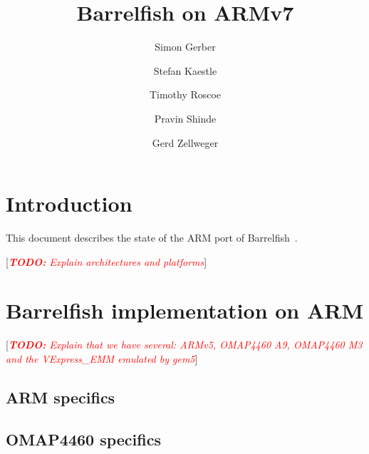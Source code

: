 \documentclass[a4paper,twoside]{report} %
\title{Barrelfish on ARMv7}   %
\author{Simon Gerber \and Stefan Kaestle \and Timothy Roscoe \and
  Pravin Shinde \and Gerd Zellweger}
\newcommand{\todo}[1]{\note{\textbf{TODO:} #1}}
\begin{document}
\maketitle

%
%
\begin{versionhistory}
\end{versionhistory}



\newcommand{\eclipse}{ECL\textsuperscript{i}PS\textsuperscript{e}\xspace}
\newcommand{\codesize}{\scriptsize}
\newcommand{\note}[1]{[\textcolor{red}{\emph{#1}}]}

\chapter{Introduction}

This document describes the state of the ARM port of
Barrelfish~\cite{barrelfish:sosp09}.

\todo{Explain architectures and platforms}

\chapter{Barrelfish implementation on ARM}\label{chap:impl}

\todo{Explain that we have several: ARMv5, OMAP4460 A9, OMAP4460 M3
  and the VExpress\_EMM emulated by gem5}

\section{ARM specifics}

\section{OMAP4460 specifics}
\end{document}

